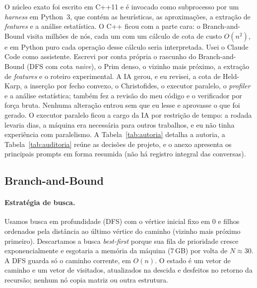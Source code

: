 \documentclass[12pt]{article}
\begin{document}
O núcleo exato foi escrito em C++11 e é invocado como subprocesso por um
\textit{harness} em Python~3, que contém as heurísticas, as aproximações, a extração
de \textit{features} e a análise estatística. O C++ ficou com a parte cara: o
Branch-and-Bound visita milhões de nós, cada um com um cálculo de cota de custo
$O(n^2)$, e em Python puro cada operação desse cálculo seria interpretada.
Usei o Claude Code como assistente. Escrevi por conta própria o rascunho do
Branch-and-Bound (DFS com cota \textit{naive}), o Prim denso, o vizinho mais próximo, a
extração de \textit{features} e o roteiro experimental. A IA gerou, e eu revisei, a cota de
Held-Karp, a inserção por fecho convexo, o Christofides, o executor paralelo, o
\textit{profiler} e a análise estatística; também fez a revisão do meu código e o
verificador por força bruta. Nenhuma alteração entrou sem que eu lesse e aprovasse o que
foi gerado. O executor paralelo ficou a cargo da IA por restrição de tempo: a rodada
levaria dias, a máquina era necessária para outros trabalhos, e eu não tinha experiência
com paralelismo. A Tabela~\ref{tab:autoria} detalha a autoria, a Tabela~\ref{tab:auditoria}
reúne as decisões de projeto, e o anexo apresenta os principais prompts em forma resumida
(não há registro integral das conversas).

\subsection{Branch-and-Bound}

\paragraph{Estratégia de busca.} Usamos busca em profundidade (DFS) com o vértice
inicial fixo em $0$ e filhos ordenados pela distância ao último vértice do caminho
(vizinho mais próximo primeiro). Descartamos a busca \textit{best-first} porque sua fila
de prioridade cresce exponencialmente e esgotaria a memória da máquina (7\,GB) por volta
de $N \approx 30$. A DFS guarda só o caminho corrente, em $O(n)$. O estado é um vetor de
caminho e um vetor de visitados, atualizados na descida e desfeitos no retorno da
recursão; nenhum nó copia matriz ou outra estrutura.
\end{document}
